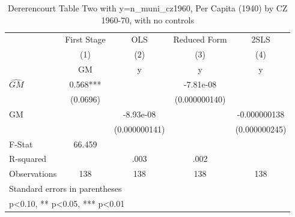 \begin{table}[htbp]\centering
\def\sym#1{\ifmmode^{#1}\else\(^{#1}\)\fi}
\caption{Dererencourt Table Two with y=n\_muni\_cz1960, Per Capita (1940) by CZ 1960-70, with no controls}
\begin{tabular}{l*{4}{c}}
\toprule
                    & First Stage   &         OLS   &Reduced Form   &        2SLS   \\
                    &\multicolumn{1}{c}{(1)}&\multicolumn{1}{c}{(2)}&\multicolumn{1}{c}{(3)}&\multicolumn{1}{c}{(4)}\\
                    &\multicolumn{1}{c}{GM}&\multicolumn{1}{c}{y}&\multicolumn{1}{c}{y}&\multicolumn{1}{c}{y}\\
\midrule
$\hat{GM}$          &       0.568***&               &   -7.81e-08   &               \\
                    &    (0.0696)   &               &(0.000000140)   &               \\
\addlinespace
GM                  &               &   -8.93e-08   &               &-0.000000138   \\
                    &               &(0.000000141)   &               &(0.000000245)   \\
\midrule
F-Stat              &      66.459   &               &               &               \\
R-squared           &               &        .003   &        .002   &               \\
Observations        &         138   &         138   &         138   &         138   \\
\bottomrule
\multicolumn{5}{l}{\footnotesize Standard errors in parentheses}\\
\multicolumn{5}{l}{\footnotesize * p<0.10, ** p<0.05, *** p<0.01}\\
\end{tabular}
\end{table}
